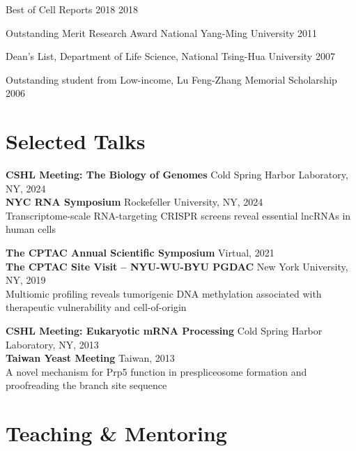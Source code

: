 \documentclass[letterpaper,11pt]{cv}
\begin{document}
\begin{detaillist}

\item Best of Cell Reports 2018
    \hfill 2018

\item Outstanding Merit Research Award National Yang-Ming University
    \hfill 2011

\item Dean's List, Department of Life Science, National Tsing-Hua University
    \hfill 2007

\item Outstanding student from Low-income, Lu Feng-Zhang Memorial Scholarship
    \hfill
    2006

\end{detaillist}

\section{Selected Talks}
\begin{entrylist}
    \item \textbf{CSHL Meeting: The Biology of Genomes} \hfill Cold Spring Harbor Laboratory, NY, 2024 \\
    \textbf{NYC RNA Symposium} \hfill Rockefeller University, NY, 2024 \\
    \small{Transcriptome-scale RNA-targeting CRISPR screens reveal essential lncRNAs in human cells}

    \item \textbf{The CPTAC Annual Scientific Symposium} \hfill Virtual, 2021 \\
    \textbf{The CPTAC Site Visit – NYU-WU-BYU PGDAC} \hfill New York University, NY, 2019 \\
    \small{Multiomic profiling reveals tumorigenic DNA methylation associated with therapeutic vulnerability and cell-of-origin} 

    \item \textbf{CSHL Meeting: Eukaryotic mRNA Processing} \hfill Cold Spring Harbor Laboratory, NY, 2013 \\
    \textbf{Taiwan Yeast Meeting} \hfill Taiwan, 2013 \\
    \small{A novel mechanism for Prp5 function in prespliceosome formation and proofreading the branch site sequence}

\end{entrylist}


\section{Teaching \& Mentoring}
\end{document}
